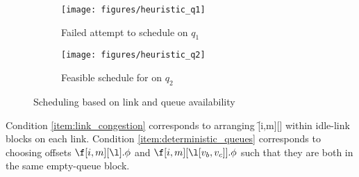 \begin{figure}[t]
\centering
	\begin{subfigure}{\linewidth}
        \centering
        \texttt{[image: figures/heuristic\_q1]}
        \vspace{-0.2cm}
        \caption{Failed attempt to schedule \s[2] on $q_1$}
        \vspace{0.4cm}
        \label{fig:heuristic_q1}
   \end{subfigure}
	\begin{subfigure}{\linewidth}
        \centering
        \texttt{[image: figures/heuristic\_q2]}
        \vspace{-0.2cm}
        \caption{Feasible schedule for \s[2] on $q_2$}
        \label{fig:heuristic_q2}
   \end{subfigure}
   \caption{Scheduling based on link and queue availability} \label{fig:heuristic}
\end{figure}

Condition \ref{item:link_congestion} corresponds to arranging \f[i,m][] within idle-link blocks on each link. Condition \ref{item:deterministic_queues} corresponds to choosing offsets $\f[i,m][\l].\phi$ and $\f[i,m][{\l[v_b, v_c]}].\phi$ such that they are both in the same empty-queue block.

